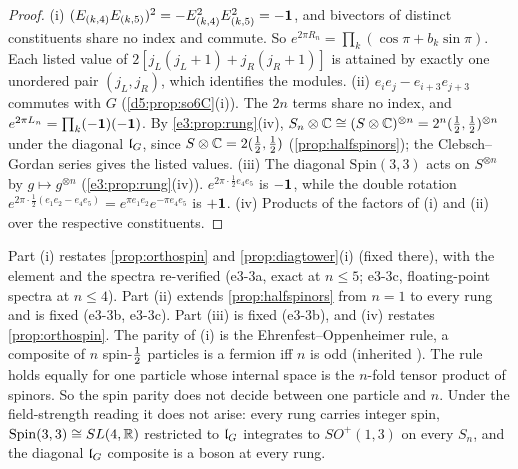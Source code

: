 \begin{proof}
(i) $(E_{(k,4)}E_{(k,5)})^2=-E_{(k,4)}^2E_{(k,5)}^2=-\mathbf 1$, and bivectors of distinct constituents share no index and commute. So
$e^{2\pi R_n}=\prod_k(\cos\pi+b_k\sin\pi)$. Each listed value of $2[j_L(j_L+1)+j_R(j_R+1)]$ is attained by exactly one unordered pair $(j_L,j_R)$, which identifies the
modules. (ii) $e_ie_j-e_{i+3}e_{j+3}$ commutes with $G$ (\cref{d5:prop:so6C}(i)). The $2n$ terms share no index, and
$e^{2\pi L_n}=\prod_k(-\mathbf 1)(-\mathbf 1)$. By \cref{e3:prop:rung}(iv), $S_n\otimes\mathbb{C}\cong(S\otimes\mathbb{C})^{\otimes n}=2^n(\tfrac12,\tfrac12)^{\otimes n}$ under the diagonal $\mathfrak l_G$,
since $S\otimes\mathbb{C}=2(\tfrac12,\tfrac12)$ (\cref{prop:halfspinors}); the Clebsch--Gordan series gives the listed values. (iii) The diagonal
$\mathrm{Spin}(3,3)$ acts on $S^{\otimes n}$ by $g\mapsto g^{\otimes n}$ (\cref{e3:prop:rung}(iv)). $e^{2\pi\cdot\frac12e_4e_5}$ is $-\mathbf 1$, while the double
rotation $e^{2\pi\cdot\frac12(e_1e_2-e_4e_5)}=e^{\pi e_1e_2}e^{-\pi e_4e_5}$ is $+\mathbf 1$. (iv) Products of the factors of (i) and (ii) over the respective
constituents.
\end{proof}

Part (i) restates \cref{prop:orthospin} and \cref{prop:diagtower}(i) (fixed there), with the element and the spectra re-verified (e3-3a,
exact at $n\le5$; e3-3c, floating-point spectra at $n\le4$). Part (ii) extends \cref{prop:halfspinors} from $n=1$ to every rung and is
fixed (e3-3b, e3-3c). Part (iii) is fixed (e3-3b), and (iv) restates \cref{prop:orthospin}. The parity of (i) is the
Ehrenfest--Oppenheimer rule, a composite of $n$ spin-$\tfrac12$ particles is a fermion iff $n$ is odd (inherited \cite{EhrenfestOppenheimer31}).
The rule holds equally for one particle whose internal space is the $n$-fold tensor product of spinors. So the spin parity does not decide
between one particle and $n$. Under the field-strength reading it does not arise: every rung carries integer spin, $\mathrm{Spin}(3,3)\cong SL(4,\mathbb{R})$
restricted to $\mathfrak l_G$ integrates to $SO^+(1,3)$ on every $S_n$, and the diagonal $\mathfrak l_G$ composite is a boson at every rung.


